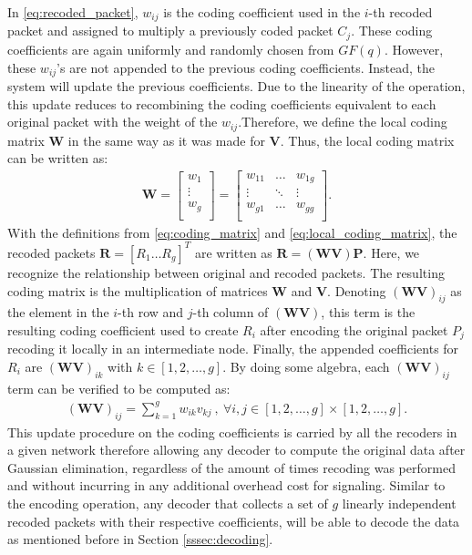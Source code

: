 In \eqref{eq:recoded_packet}, $w_{ij}$ is the coding coefficient used
in the $i$-th recoded packet and assigned to multiply a previously
coded packet $C_j$. These coding coefficients are again uniformly and
randomly chosen from $GF(q)$. However, these $w_{ij}$'s are not
appended to the previous coding coefficients.  Instead, the system
will update the previous coefficients. Due to the linearity of the
operation, this update reduces to recombining the coding coefficients
equivalent to each original packet with the weight of the
$w_{ij}$.Therefore, we define the local coding matrix $\textbf{W}$ in
the same way as it was made for $\textbf{V}$. Thus, the local coding
matrix can be written as:
%
\begin{align} \label{eq:local_coding_matrix}
\textbf{W} =
\left[
\begin{array}{c}
        w_1    \\ \hline
        \vdots \\ \hline
        w_g    \\
\end{array}
\right]
=
\left[
\begin{array}{ccc}
        w_{11} & \ldots & w_{1g} \\
        \vdots  & \ddots & \vdots  \\
        w_{g1} & \ldots & w_{gg} \\
\end{array}
\right].
\end{align}
%
With the definitions from \eqref{eq:coding_matrix} and
\eqref{eq:local_coding_matrix}, the recoded packets
$\textbf{R} = \left[R_1 \ldots R_g \right]^T$ are written as
$\textbf{R} = (\textbf{W} \textbf{V}) \textbf{P}$. Here, we recognize
the relationship between original and recoded packets. The resulting
coding matrix is the multiplication of matrices $\textbf{W}$ and
$\textbf{V}$. Denoting ${(\textbf{W} \textbf{V})}_{ij}$ as the element
in the $i$-th row and $j$-th column of $(\textbf{W} \textbf{V})$, this
term is the resulting coding coefficient used to create $R_i$ after
encoding the original packet $P_j$ recoding it locally in an intermediate
node. Finally, the appended coefficients for $R_i$ are
${(\textbf{W} \textbf{V})}_{ik}$ with $k \in [1,2,\ldots,g]$. By doing some
algebra, each ${(\textbf{W} \textbf{V})}_{ij}$ term can be verified to be
computed as:
%
\begin{align}
\label{eq:appended_coded_coefficients}
{(\textbf{W} \textbf{V})}_{ij} = \sum_{k=1}^{g} w_{ik} v_{kj}\ ,\ \forall i,j \in [1,2,\ldots,g] \times [1,2,\ldots,g].
\end{align}
%
This update procedure on the coding coefficients is carried by all the
recoders in a given network therefore allowing any decoder to compute
the original data after Gaussian elimination, regardless of the amount
of times recoding was performed and without incurring in any
additional overhead cost for signaling. Similar to the encoding
operation, any decoder that collects a set of $g$ linearly independent recoded
packets with their respective coefficients, will be able to decode the
data as mentioned before in Section \ref{sssec:decoding}.

